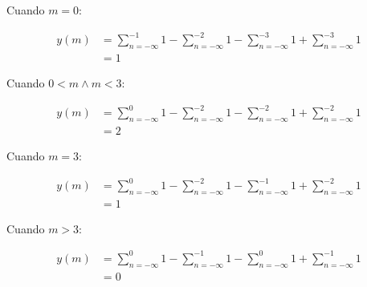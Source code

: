 \documentclass[a4paper,12pt,final]{article}
\begin{document}
\begin{enumerate}[label=\alph*)]
          \noindent Cuando $m=0$:

          \begin{equation*}
            \begin{split}
              y\left(m\right) & = \sum_{n=-\infty}^{-1} 1 -
                                  \sum_{n=-\infty}^{-2} 1 -
                                  \sum_{n=-\infty}^{-3} 1 +
                                  \sum_{n=-\infty}^{-3} 1 \\
                              & = 1
            \end{split}
          \end{equation*}

          \noindent Cuando $0<m \wedge m<3$:

          \begin{equation*}
            \begin{split}
              y\left(m\right) & = \sum_{n=-\infty}^{0} 1 -
                                  \sum_{n=-\infty}^{-2} 1 -
                                  \sum_{n=-\infty}^{-2} 1 +
                                  \sum_{n=-\infty}^{-2} 1 \\
                              & = 2
            \end{split}
          \end{equation*}

          \noindent Cuando $m=3$:

          \begin{equation*}
            \begin{split}
              y\left(m\right) & = \sum_{n=-\infty}^{0} 1 -
                                  \sum_{n=-\infty}^{-2} 1 -
                                  \sum_{n=-\infty}^{-1} 1 +
                                  \sum_{n=-\infty}^{-2} 1 \\
                              & = 1
            \end{split}
          \end{equation*}

          \noindent Cuando $m>3$:

          \begin{equation*}
            \begin{split}
              y\left(m\right) & = \sum_{n=-\infty}^{0} 1 -
                                  \sum_{n=-\infty}^{-1} 1 -
                                  \sum_{n=-\infty}^{0} 1 +
                                  \sum_{n=-\infty}^{-1} 1 \\
                              & = 0
            \end{split}
          \end{equation*}


\end{enumerate}
\end{document}
